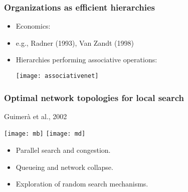 \begin{frame}
  \frametitle{Organizations as efficient hierarchies}

  \begin{block}{}
    \begin{itemize}
    \item<1->
      Economics: 
    \item<1->
      e.g., Radner (1993)\cite{radner1993a}, Van Zandt (1998)\cite{vanzandt1998a}
    \item<1->
      Hierarchies performing associative operations:
      \begin{center}
        \texttt{[image: associativenet]}
      \end{center}
    \end{itemize}
  \end{block}

\end{frame}

\begin{frame}
  \frametitle{Optimal network topologies for local search}


  \begin{block}{Guimer\`{a} et al., 2002\cite{guimera2002b}}
  \begin{center}
    \texttt{[image: mb]}
    \texttt{[image: md]}
    \begin{itemize}
    \item<1->
      Parallel search and congestion.
    \item<1->
      Queueing and network collapse.
    \item<1-> 
      Exploration of random search mechanisms.
    \end{itemize}
  \end{center}
  \end{block}

\end{frame}

